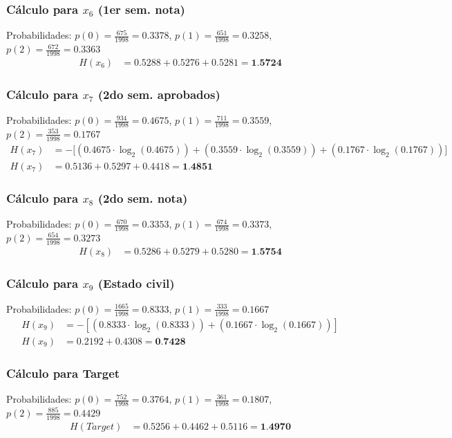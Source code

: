 \documentclass[12pt,a4paper]{article}
\begin{document}
\subsubsection{Cálculo para $x_6$ (1er sem. nota)}
Probabilidades: $p(0) = \frac{675}{1998} = 0.3378$, $p(1) = \frac{651}{1998} = 0.3258$, $p(2) = \frac{672}{1998} = 0.3363$
\begin{align*}
    H(x_6) &= 0.5288 + 0.5276 + 0.5281 = \textbf{1.5724}
\end{align*}

\subsubsection{Cálculo para $x_7$ (2do sem. aprobados)}
Probabilidades: $p(0) = \frac{934}{1998} = 0.4675$, $p(1) = \frac{711}{1998} = 0.3559$, $p(2) = \frac{353}{1998} = 0.1767$
\begin{align*}
    H(x_7) &= -\big[ (0.4675 \cdot \log_2(0.4675)) + (0.3559 \cdot \log_2(0.3559)) + (0.1767 \cdot \log_2(0.1767)) \big] \\
    H(x_7) &= 0.5136 + 0.5297 + 0.4418 = \textbf{1.4851}
\end{align*}

\subsubsection{Cálculo para $x_8$ (2do sem. nota)}
Probabilidades: $p(0) = \frac{670}{1998} = 0.3353$, $p(1) = \frac{674}{1998} = 0.3373$, $p(2) = \frac{654}{1998} = 0.3273$
\begin{align*}
    H(x_8) &= 0.5286 + 0.5279 + 0.5280 = \textbf{1.5754}
\end{align*}

\subsubsection{Cálculo para $x_9$ (Estado civil)}
Probabilidades: $p(0) = \frac{1665}{1998} = 0.8333$, $p(1) = \frac{333}{1998} = 0.1667$
\begin{align*}
    H(x_9) &= -\left[ (0.8333 \cdot \log_2(0.8333)) + (0.1667 \cdot \log_2(0.1667)) \right] \\
    H(x_9) &= 0.2192 + 0.4308 = \textbf{0.7428}
\end{align*}

\subsubsection{Cálculo para Target}
Probabilidades: $p(0) = \frac{752}{1998} = 0.3764$, $p(1) = \frac{361}{1998} = 0.1807$, $p(2) = \frac{885}{1998} = 0.4429$
\begin{align*}
    H(Target) &= 0.5256 + 0.4462 + 0.5116 = \textbf{1.4970}
\end{align*}
\end{document}
